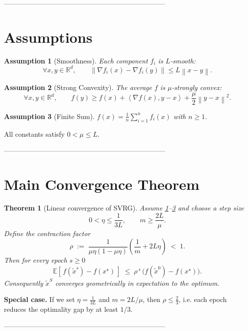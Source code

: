 \documentclass{article}
\newtheorem{theorem}{Theorem}
\newtheorem{assumption}{Assumption}
\newcommand{\E}{\mathbb{E}}
\newcommand{\norm}[1]{\left\|#1\right\|}
\newcommand{\inner}[2]{\left\langle #1,#2\right\rangle}
\newcommand{\grad}{\nabla}
\newcommand{\R}{\mathbb{R}}
\begin{document}
-----------------------------------------------------------------------

\section*{Assumptions}
\begin{assumption}[Smoothness]\label{as:smooth}
Each component $f_i$ is $L$‑smooth:
\[
\forall x,y\in\R^{d},\qquad 
\norm{\grad f_i(x)-\grad f_i(y)}\le L\norm{x-y}.
\]
\end{assumption}
\begin{assumption}[Strong Convexity]\label{as:strong}
The average $f$ is $\mu$‑strongly convex:
\[
\forall x,y\in\R^{d},\qquad 
f(y)\ge f(x)+\inner{\grad f(x)}{y-x}+\frac{\mu}{2}\norm{y-x}^{2}.
\]
\end{assumption}
\begin{assumption}[Finite Sum]\label{as:finite}
$f(x)=\frac1n\sum_{i=1}^{n}f_i(x)$ with $n\ge 1$.
\end{assumption}
All constants satisfy $0<\mu\le L$.

-----------------------------------------------------------------------

\section*{Main Convergence Theorem}
\begin{theorem}[Linear convergence of SVRG]\label{thm:linear}
Assume \ref{as:smooth}–\ref{as:finite} and choose a step size 
\[
0<\eta\le \frac{1}{3L},
\qquad 
m\ge \frac{2L}{\mu}.
\]
Define the contraction factor
\[
\rho \;:=\; \frac{1}{\mu\eta (1-\mu\eta)}\left(\frac{1}{m}+2L\eta\right)\;<\;1 .
\]
Then for every epoch $s\ge 0$
\[
\E\!\left[\,f(\tilde{x}^{s})-f(x^{\star})\,\right]\;\le\;\rho^{\,s}\,\bigl(f(\tilde{x}^{0})-f(x^{\star})\bigr).
\]
Consequently $\tilde{x}^{S}$ converges \emph{geometrically} in expectation to the optimum.
\end{theorem}

\noindent\textbf{Special case.} If we set $\eta=\frac{1}{3L}$ and $m=2L/\mu$, then $\rho\le \frac{2}{3}$, i.e. each epoch reduces the optimality gap by at least $1/3$.

-----------------------------------------------------------------------
\end{document}

